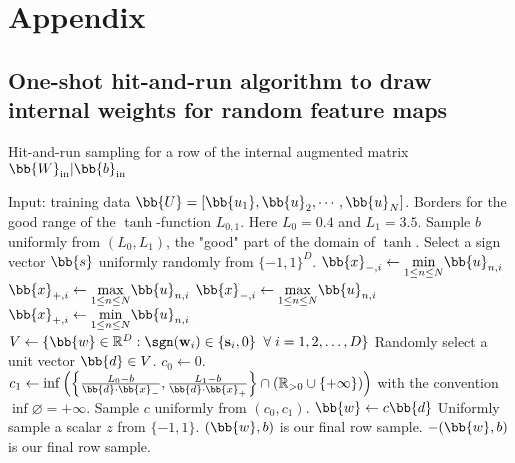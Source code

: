 \section{Appendix}

\label{sec:appendix}


\subsection{One-shot hit-and-run algorithm to draw internal weights for random feature maps}
\label{sec:app:algo:hr}

\begin{algorithm}[!htp]
\caption{Hit-and-run sampling for a row of the internal augmented matrix $\bb{W}_{\rm in}|\bb{b}_{\rm in}$}
\label{algo:hr}
\begin{algorithmic}[1]
\STATE Input: training data $\bb{U}=[\bb{u_1}, \bb{u}_2, \cdots, \bb{u}_N]$. Borders for the good range of the $\tanh$-function $L_{0,1}$. Here $L_0=0.4$ and $L_1=3.5$.
\STATE Sample $b$ uniformly from $(L_0, L_1)$, the "good" part of the domain of $\tanh$.
\STATE Select a sign vector $\bb{s}$ uniformly randomly from $\{-1, 1\}^D$.
        \STATE $\bb{x}_{-,i} \leftarrow \underset{1\le n\le N}{\min} \bb{u}_{n,i}$
        \STATE $\bb{x}_{+,i} \leftarrow \underset{1\le n\le N}{\max} \bb{u}_{n,i}$
    \ELSE
        \STATE $\bb{x}_{-,i} \leftarrow \underset{1\le n\le N}{\max} \bb{u}_{n,i}$
        \STATE $\bb{x}_{+,i} \leftarrow \underset{1\le n\le N}{\min} \bb{u}_{n,i}$
    \ENDIF
\ENDFOR
\STATE $V\leftarrow\{\bb{w}\in\mathbb{R}^D:\sgn(\mathbf{w}_i)\in\{\mathbf{s}_i, 0\}\;\;\forall\;i=1,2,\ldots,D\}$
\STATE Randomly select a unit vector $\bb{d}\in V$. 
    \STATE $c_0\leftarrow0$.
    \STATE $c_1\leftarrow\inf\left(\left\{\frac{L_0-b}{\bb{d}\cdot \bb{x}_-},\frac{L_1-b}{\bb{d}\cdot \bb{x}_+}\right\}\cap(\mathbb R_{>0}\cup\{+\infty\})\right)$ with the convention $\inf\varnothing=+\infty$.
    \STATE Sample $c$ uniformly from $(c_0, c_1)$.
    \STATE $\bb{w}\leftarrow c\bb{d}$
\STATE Uniformly sample a scalar $z$ from $\{-1, 1\}$.
    \STATE $(\bb{w},b)$ is our final row sample. 
\ELSE
    \STATE $-(\bb{w},b)$ is our final row sample. 
\ENDIF
\end{algorithmic}
\end{algorithm}


